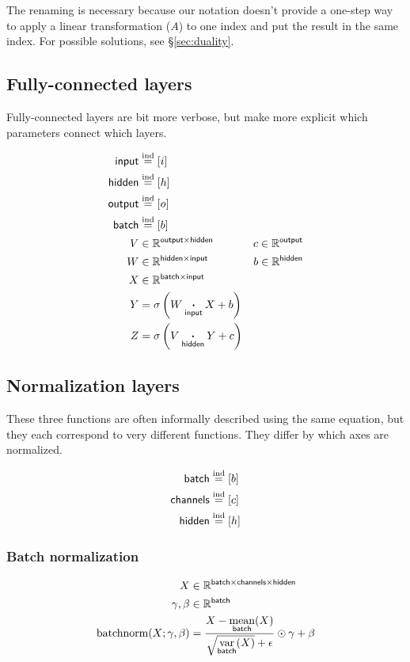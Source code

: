\documentclass{article}
\newcommand{\reals}{\mathbb{R}}
\begin{document}
The renaming is necessary because our notation doesn't provide a one-step way to apply a linear transformation ($A$) to one index and put the result in the same index. For possible solutions, see \S\ref{sec:duality}.

\subsection{Fully-connected layers}

Fully-connected layers are bit more verbose, but make more explicit which parameters connect which layers.

\begin{align*}
\name{input} &\ndef [i] \\  
\name{hidden} &\ndef [h] \\  
\name{output} &\ndef [o] \\  
\name{batch} &\ndef [b] \\  
V &\in \reals^{\name{output} \times \name{hidden}} & c\in \reals^{\name{output}} \\
W &\in \reals^{{\name{hidden} \times \name{input}}} & b \in \reals^{\name{hidden}} \\
X &\in \reals^{{\name{batch} \times \name{input}}} \\
Y &= \sigma \left( W \ndot{input} X + b \right) \\
Z &= \sigma \left( V \ndot{hidden} Y + c \right)  
\end{align*}

\subsection{Normalization layers}

These three functions are often informally described using the same
equation, but they each correspond to very different functions. They differ
by which axes are normalized.

\begin{align*}
  \mathsf{batch} &\overset{\textrm{ind}}= [b] \\
  \mathsf{channels} &\overset{\textrm{ind}}= [c] \\
  \mathsf{hidden} &\overset{\textrm{ind}}= [h]
\end{align*}

\subsubsection*{Batch normalization}

\begin{align*}
X &\in \reals^{{\name{batch} \times \name{channels} \times \name{hidden}}}\\
\gamma, \beta &\in \reals^{{\name{batch}}} \\
\text{batchnorm}(X; \gamma, \beta) &= \frac{X - \nfun{batch}{mean}(X)}{\sqrt{\nfun{batch}{var}(X)} + \epsilon} \odot \gamma + \beta
\end{align*}
\end{document}
